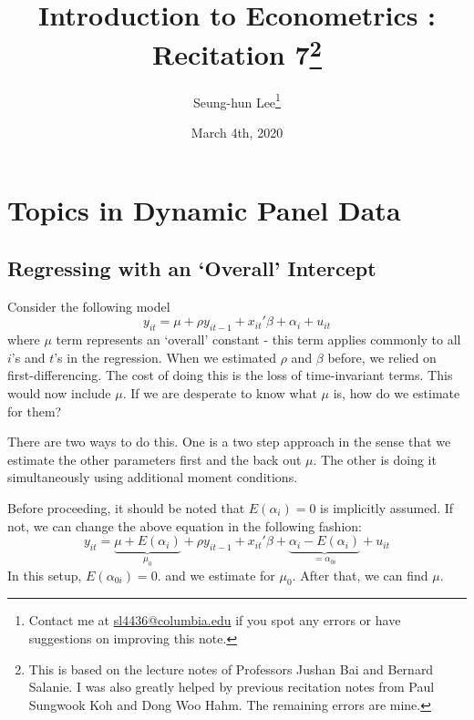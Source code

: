 \documentclass[12pt]{article}
\title{Introduction to Econometrics \ROM{2}: Recitation 7\footnote{This is based on the lecture notes of Professors Jushan Bai and Bernard Salanie. I was also greatly helped by previous recitation notes from Paul Sungwook Koh and Dong Woo Hahm. The remaining errors are mine. }}
\theoremstyle{definition}
\theoremstyle{property}
\theoremstyle{assumption}
\theoremstyle{example}
\theoremstyle{comment}
\begin{document}
\linespread{1.25}
\onehalfspacing

\author{Seung-hun Lee\footnote{Contact me at \href{mailto:sl4436@columbia.edu}{sl4436@columbia.edu} if you spot any errors or have suggestions on improving this note.}}
\date{March 4th, 2020}
\maketitle
\thispagestyle{firstpage}

\section{Topics in Dynamic Panel Data}
\subsection{Regressing with an `Overall' Intercept}
Consider the following model
\[
y_{it}=\mu+\rho y_{it-1}+x_{it}'\beta+\alpha_i + u_{it}
\]
where $\mu$ term represents an `overall' constant - this term applies commonly to all $i$'s and $t$'s in the regression. When we estimated $\rho$ and $\beta$ before, we relied on first-differencing. The cost of doing this is the loss of time-invariant terms. This would now include $\mu$. If we are desperate to know what $\mu$ is, how do we estimate for them? \par
There are two ways to do this. One is a two step approach in the sense that we estimate the other parameters first and the back out $\mu$. The other is doing it simultaneously using additional moment conditions. \par
Before proceeding, it should be noted that $E(\alpha_i)=0$ is implicitly assumed. If not, we can change the above equation in the following fashion:
\[
y_{it}=\underbrace{\mu+E(\alpha_i)}_{\mu_0}+\rho y_{it-1}+x_{it}'\beta+\underbrace{\alpha_i-E(\alpha_i)}_{=\alpha_{0i}} + u_{it}
\]
In this setup, $E(\alpha_{0i})=0$. and we estimate for $\mu_0$. After that, we can find $\mu$.  \par
\end{document}
